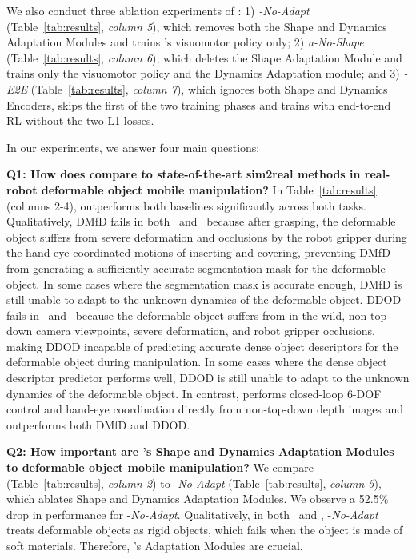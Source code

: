 We also conduct three ablation experiments of \methodname{}: 1) \textit{\methodname{}-\textit{No-Adapt}} (Table~\ref{tab:results}, \textit{column 5}), which removes both the Shape and Dynamics Adaptation Modules and trains \methodname{}'s visuomotor policy only; 2) \textit{a\methodname{}-No-Shape} (Table~\ref{tab:results}, \textit{column 6}), which deletes the Shape Adaptation Module and trains only the visuomotor policy and the Dynamics Adaptation module; and 3) \textit{\methodname{}-E2E} (Table~\ref{tab:results}, \textit{column 7}), which ignores both Shape and Dynamics Encoders, skips the first of the two training phases and trains \methodname{} with end-to-end RL without the two L1 losses.

In our experiments, we answer four main questions:

\textbf{Q1: How does \methodname{} compare to state-of-the-art sim2real methods in real-robot deformable object mobile manipulation?} In Table~\ref{tab:results} (columns 2-4), \methodname{} outperforms both baselines significantly across both tasks. Qualitatively, DMfD fails in both \taskone~and \tasktwo~because after grasping, the deformable object suffers from severe deformation and occlusions by the robot gripper during the hand-eye-coordinated motions of inserting and covering, preventing DMfD from generating a sufficiently accurate segmentation mask for the deformable object. In some cases where the segmentation mask is accurate enough, DMfD is still unable to adapt to the unknown dynamics of the deformable object. DDOD fails in \taskone~and \tasktwo~because the deformable object suffers from in-the-wild, non-top-down camera viewpoints, severe deformation, and robot gripper occlusions, making DDOD incapable of predicting accurate dense object descriptors for the deformable object during manipulation.
In some cases where the dense object descriptor predictor performs well, DDOD is still unable to adapt to the unknown dynamics of the deformable object. In contrast, \methodname{} performs closed-loop 6-DOF control and hand-eye coordination directly from non-top-down depth images and outperforms both DMfD and DDOD. 

\textbf{Q2: How important are \methodname{}'s Shape and Dynamics Adaptation Modules to deformable object mobile manipulation?} We compare \methodname{} (Table~\ref{tab:results}, \textit{column 2}) to \textit{\methodname{}-\textit{No-Adapt}} (Table~\ref{tab:results}, \textit{column 5}), which ablates Shape and Dynamics Adaptation Modules. We observe a 52.5\% drop in performance for \methodname{}-\textit{No-Adapt}. Qualitatively, in both \taskone~and \tasktwo, \methodname{}-\textit{No-Adapt} treats deformable objects as rigid objects, which fails when the object is made of soft materials. Therefore, \methodname{}'s Adaptation Modules are crucial.


